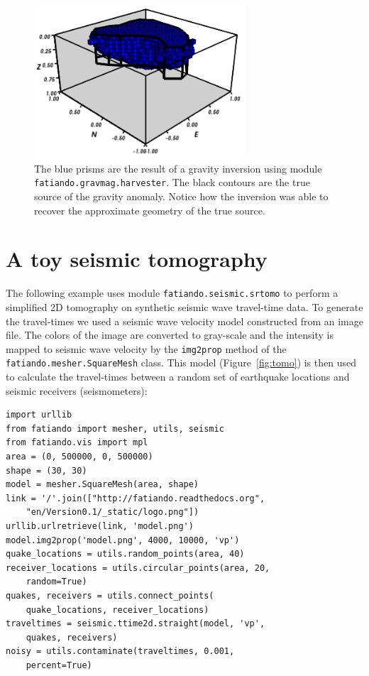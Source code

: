 \begin{figure}
    \centering
    \includegraphics[width=0.7\textwidth]{figures/paper1/gravmag_harvester}
    \caption{
        The blue prisms are the result of a gravity inversion using module
        \texttt{fatiando.gravmag.harvester}. The black contours are the true
        source of the gravity anomaly. Notice how the inversion was able to
        recover the approximate geometry of the true source.
    }
    \label{fig:harvester}
\end{figure}




\section{A toy seismic tomography}

The following example uses module \texttt{fatiando.seismic.srtomo} to
perform a simplified 2D tomography on synthetic seismic wave travel-time
data. To generate the travel-times we used a seismic wave velocity model
constructed from an image file. The colors of the image are converted to
gray-scale and the intensity is mapped to seismic wave velocity by the
\texttt{img2prop} method of the \texttt{fatiando.mesher.SquareMesh}
class. This model (Figure~\ref{fig:tomo}) is then used to calculate the
travel-times between a random set of earthquake locations and seismic
receivers (seismometers):

\begin{verbatim}
import urllib
from fatiando import mesher, utils, seismic
from fatiando.vis import mpl
area = (0, 500000, 0, 500000)
shape = (30, 30)
model = mesher.SquareMesh(area, shape)
link = '/'.join(["http://fatiando.readthedocs.org",
    "en/Version0.1/_static/logo.png"])
urllib.urlretrieve(link, 'model.png')
model.img2prop('model.png', 4000, 10000, 'vp')
quake_locations = utils.random_points(area, 40)
receiver_locations = utils.circular_points(area, 20,
    random=True)
quakes, receivers = utils.connect_points(
    quake_locations, receiver_locations)
traveltimes = seismic.ttime2d.straight(model, 'vp',
    quakes, receivers)
noisy = utils.contaminate(traveltimes, 0.001,
    percent=True)
\end{verbatim}

